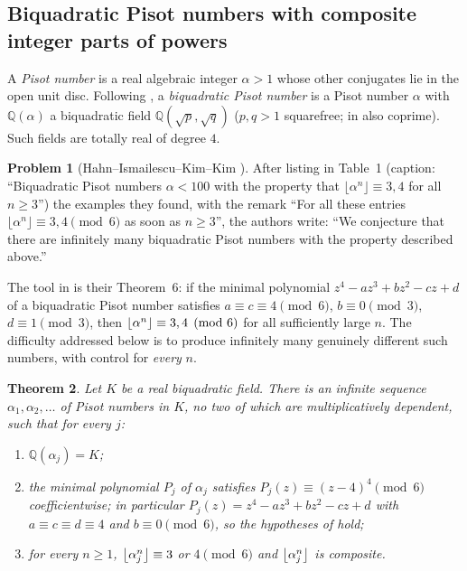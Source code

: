 \documentclass[11pt]{amsart}
\newtheorem{theorem}{Theorem}[section]
\theoremstyle{definition}
\newtheorem{problem}[theorem]{Problem}
\theoremstyle{remark}
\providecommand{\Q}{\mathbb Q}
\begin{document}
\subsection{Biquadratic Pisot numbers with composite integer parts of powers}
\label{R6:subsec:biquad}

A \emph{Pisot number} is a real algebraic integer $\alpha>1$ whose other conjugates lie in the open
unit disc. Following \cite{R6-HIKK}, a \emph{biquadratic Pisot number} is a Pisot number $\alpha$
with $\Q(\alpha)$ a biquadratic field $\Q(\sqrt p,\sqrt q)$ ($p,q>1$ squarefree; in
\cite{R6-HIKK} also coprime). Such fields are totally real of degree $4$.

\begin{problem}[Hahn--Ismailescu--Kim--Kim {\cite[\S5, after Table~1]{R6-HIKK}}]
\label{R6:prob:HIKK}
After listing in Table~1 (caption: ``Biquadratic Pisot numbers $\alpha<100$ with the property that
$\lfloor\alpha^n\rfloor\equiv 3,4$ for all $n\ge3$'') the examples they found, with the remark
``For all these entries $\lfloor\alpha^n\rfloor\equiv 3,4\pmod 6$ as soon as $n\ge3$'', the authors write:
``We conjecture that there are infinitely many biquadratic Pisot numbers with the property described above.''
\end{problem}

The tool in \cite{R6-HIKK} is their Theorem~6: if the minimal polynomial
$z^4-az^3+bz^2-cz+d$ of a biquadratic Pisot number satisfies $a\equiv c\equiv 4\pmod 6$,
$b\equiv0\pmod 3$, $d\equiv 1\pmod 3$, then $\left\lfloor \alpha^n\right\rfloor\equiv 3,4\pmod 6$ for all
sufficiently large $n$. The difficulty addressed below is to produce infinitely many genuinely
different such numbers, with control for \emph{every} $n$.

\begin{theorem}\label{R6:thm:biquad}
Let $K$ be a real biquadratic field. There is an infinite sequence $\alpha_1,\alpha_2,\dots$ of
Pisot numbers in $K$, no two of which are multiplicatively dependent, such that for every $j$:
\begin{enumerate}
\item[(i)] $\Q(\alpha_j)=K$;
\item[(ii)] the minimal polynomial $P_j$ of $\alpha_j$ satisfies $P_j(z)\equiv (z-4)^4\pmod 6$
coefficientwise; in particular $P_j(z)=z^4-az^3+bz^2-cz+d$ with $a\equiv c\equiv d\equiv 4$ and
$b\equiv 0\pmod 6$, so the hypotheses of \cite[Theorem~6]{R6-HIKK} hold;
\item[(iii)] for every $n\ge 1$, $\left\lfloor \alpha_j^n\right\rfloor\equiv 3$ or $4\pmod 6$ and $\left\lfloor \alpha_j^n\right\rfloor$ is
composite.
\end{enumerate}
\end{theorem}
\end{document}

